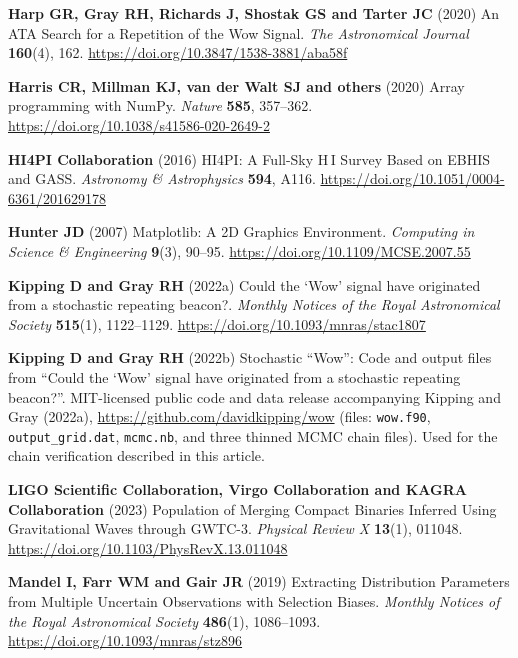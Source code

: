\documentclass[crop]{CSL}
\begin{document}
\begin{thebibliography}{}
\textbf{Harp GR, Gray RH, Richards J, Shostak GS and Tarter JC} (2020) An ATA Search for a Repetition of the Wow Signal. \textit{The Astronomical Journal} \textbf{160}(4), 162. \url{https://doi.org/10.3847/1538-3881/aba58f}

\textbf{Harris CR, Millman KJ, van der Walt SJ and others} (2020) Array programming with NumPy. \textit{Nature} \textbf{585}, 357--362. \url{https://doi.org/10.1038/s41586-020-2649-2}

\textbf{HI4PI Collaboration} (2016) HI4PI: A Full-Sky H\,I Survey Based on EBHIS and GASS. \textit{Astronomy \& Astrophysics} \textbf{594}, A116. \url{https://doi.org/10.1051/0004-6361/201629178}

\textbf{Hunter JD} (2007) Matplotlib: A 2D Graphics Environment. \textit{Computing in Science \& Engineering} \textbf{9}(3), 90--95. \url{https://doi.org/10.1109/MCSE.2007.55}

\textbf{Kipping D and Gray RH} (2022a) Could the `Wow' signal have originated from a stochastic repeating beacon?. \textit{Monthly Notices of the Royal Astronomical Society} \textbf{515}(1), 1122--1129. \url{https://doi.org/10.1093/mnras/stac1807}

\textbf{Kipping D and Gray RH} (2022b) Stochastic ``Wow'': Code and output files from ``Could the `Wow' signal have originated from a stochastic repeating beacon?''. MIT-licensed public code and data release accompanying Kipping and Gray (2022a), \url{https://github.com/davidkipping/wow} (files: \texttt{wow.f90}, \texttt{output\_grid.dat}, \texttt{mcmc.nb}, and three thinned MCMC chain files). Used for the chain verification described in this article.

\textbf{LIGO Scientific Collaboration, Virgo Collaboration and KAGRA Collaboration} (2023) Population of Merging Compact Binaries Inferred Using Gravitational Waves through GWTC-3. \textit{Physical Review X} \textbf{13}(1), 011048. \url{https://doi.org/10.1103/PhysRevX.13.011048}

\textbf{Mandel I, Farr WM and Gair JR} (2019) Extracting Distribution Parameters from Multiple Uncertain Observations with Selection Biases. \textit{Monthly Notices of the Royal Astronomical Society} \textbf{486}(1), 1086--1093. \url{https://doi.org/10.1093/mnras/stz896}


\end{thebibliography}
\end{document}
